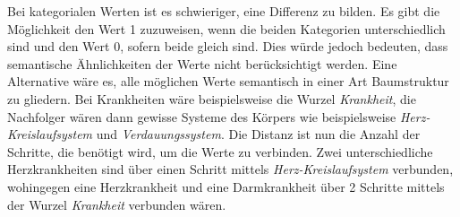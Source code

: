 Bei kategorialen Werten ist es schwieriger, eine Differenz zu bilden.
Es gibt die Möglichkeit den Wert 1 zuzuweisen, wenn die beiden Kategorien unterschiedlich sind und den Wert 0, sofern beide gleich sind. 
Dies würde jedoch bedeuten, dass semantische Ähnlichkeiten der Werte nicht berücksichtigt werden.
Eine Alternative wäre es, alle möglichen Werte semantisch in einer Art Baumstruktur zu gliedern. 
Bei Krankheiten wäre beispielsweise die Wurzel \textit{\dq Krankheit\dq}, die Nachfolger wären dann gewisse Systeme des Körpers wie beispielsweise \textit{\dq Herz-Kreislaufsystem\dq} und \textit{\dq Verdauungssystem\dq}.
Die Distanz ist nun die Anzahl der Schritte, die benötigt wird, um die Werte zu verbinden. 
Zwei unterschiedliche Herzkrankheiten sind über einen Schritt mittels \textit{\dq Herz-Kreislaufsystem\dq} verbunden, wohingegen eine Herzkrankheit und eine Darmkrankheit über 2 Schritte mittels der Wurzel \textit{\dq Krankheit\dq} verbunden wären.